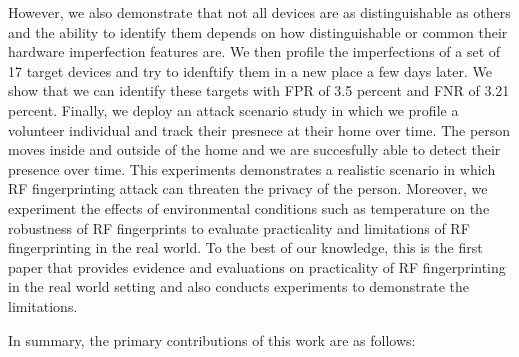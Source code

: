  However, we also demonstrate that not all devices are as distinguishable as others and the ability to identify them depends on how distinguishable or common their hardware imperfection features are. We then profile the imperfections of a set of 17 target devices and try to idenftify them in a new place a few days later. We show that we can identify these targets with FPR of 3.5 percent and FNR of 3.21 percent. Finally, we deploy an attack scenario study in which we profile a volunteer individual and track their presnece at their home over time. The person moves inside and outside of the home and we are succesfully able to detect their presence over time. This experiments demonstrates a realistic scenario in which RF fingerprinting attack can threaten the privacy of the person. Moreover, we experiment the effects of environmental conditions such as temperature on the robustness of RF fingerprints to evaluate practicality and limitations of RF fingerprinting in the real world. To the best of our knowledge, this is the first paper that provides evidence and evaluations on practicality of RF fingerprinting in the real world setting and also conducts experiments to demonstrate the limitations.


In summary, the primary contributions of this work are as follows:

